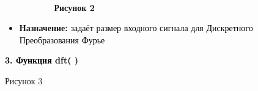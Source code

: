 \documentclass[a4paper]{article}
\newcommand\textstyleBulletSymbols[1]{\textrm{#1}}
\renewcommand\thepage{\arabic{page}}
\begin{document}
\begin{center}
\end{center}

\bigskip

{\bfseries
\ \ \ \ \ \ \ \ \ \ \ \ \ \ \ \ \ \ \ \ \ \ \ \ \ \ \ \ \ \ \ \ \ \ \ \ \ \ \ \ \ \ \ \ \ \ \ \ \ \ \ \ \ \ \ \ \ \ \ \ \ \ \ \ \ \ \ \ \ \ \ \ \textmd{Рисунок
2}}


\bigskip


\bigskip

\begin{itemize}[series=listLii,label=\textstyleBulletSymbols{•}]
\item \foreignlanguage{russian}{\textbf{Назначение:}}\foreignlanguage{russian}{ }\textcolor{black}{задаёт размер
входного сигнала для Дискретного Преобразования Фурье }
\end{itemize}

\bigskip


\bigskip


\bigskip


\bigskip


\bigskip


\bigskip


\bigskip


\bigskip


\bigskip


\bigskip


\bigskip

{\centering{}\bfseries\color{black}
\thepage{}
\par}


\bigskip


\bigskip


\bigskip

{\bfseries
\foreignlanguage{russian}{\textcolor{black}{3. Функция }}\foreignlanguage{english}{\textcolor{black}{dft( )}}}


\bigskip


\bigskip

\centering\par
\begin{center}
\end{center}
{\centering{}\color{black}
Рисунок 3
\par}
\end{document}
